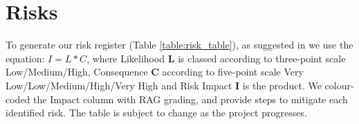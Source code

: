 \section{Risks} \label{risks}

To generate our risk register (Table \ref{table:risk_table}), as suggested in \cite{Dawson:2009:PCI:1611433} we use the equation: $I = L * C$,
where Likelihood \textbf{L} is classed according to three-point scale 
Low/Medium/High, Consequence \textbf{C} according to five-point
scale Very Low/Low/Medium/High/Very High and Risk Impact \textbf{I} is the product. We colour-coded the Impact column with RAG grading, and provide steps to mitigate each identified risk. The table is subject to change as the project progresses.



